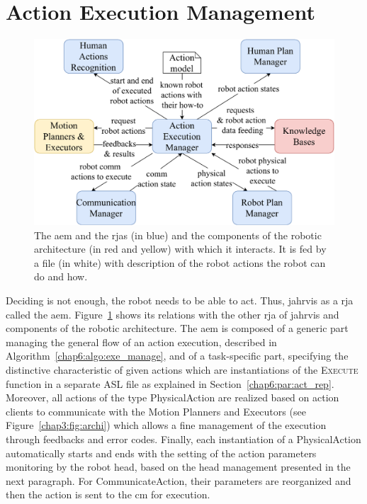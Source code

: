 \documentclass[a4paper,11pt,twoside]{StyleThese}
\begin{document}
\clearpage

\section{Action Execution Management}\label{chap6:sec:aem}

\begin{figure}[!hbt]
	\centering
	\includegraphics[width=0.85\linewidth]{figures/chapter2/action_exe_manager_zoom.pdf}
	\caption{The \acrlong{aem} and the \acrshort{rja}s (in blue) and the components of the robotic architecture (in red and yellow) with which it interacts. It is fed by a file (in white) with description of the robot actions the robot can do and how.}
	\label{chap6:fig:action_exe_zoom}
\end{figure}

Deciding is not enough, the robot needs to be able to act. Thus, \acrshort{jahrvis} as a \acrfull{rja} called the \acrfull{aem}. Figure~\ref{chap6:fig:action_exe_zoom} shows its relations with the other \acrshort{rja} of \acrshort{jahrvis} and components of the robotic architecture. The \acrshort{aem} is composed of a generic part managing the general flow of an action execution, described in Algorithm~\ref{chap6:algo:exe_manage}, and of a task-specific part, specifying the distinctive characteristic of given actions which are instantiations of the \textsc{Execute} function in a separate ASL file as explained in Section~\ref{chap6:par:act_rep}. Moreover, all actions of the type PhysicalAction are realized based on action clients to communicate with the Motion Planners and Executors (see Figure~\ref{chap3:fig:archi}) which allows a fine management of the execution through feedbacks and error codes. Finally, each instantiation of a PhysicalAction automatically starts and ends with the setting of the action parameters monitoring by the robot head, based on the head management presented in the next paragraph. For CommunicateAction, their parameters are reorganized and then the action is sent to the \acrshort{cm} for execution. 
\end{document}
